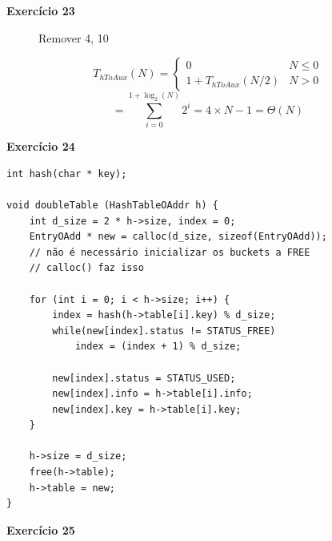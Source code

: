 \documentclass[a4paper,11pt]{article}
\begin{document}
\noindent \textbf{Exercício 23}

\begin{figure}[H]
	\centering
	\caption{Remover 4, 10}
\end{figure}

\[
	T_{hToAux}(N) =
	\begin{cases}
		0 & N \leq 0 \\
		1 + T_{hToAux}(N/2) & N > 0
	\end{cases}
\]
\[
	= \sum_{i=0}^{1+\log_2(N)} 2^i = 4 \times N - 1 = \Theta(N)
\]

\noindent \textbf{Exercício 24}

\begin{verbatim}
int hash(char * key);

void doubleTable (HashTableOAddr h) {
	int d_size = 2 * h->size, index = 0;
	EntryOAdd * new = calloc(d_size, sizeof(EntryOAdd));
	// não é necessário inicializar os buckets a FREE
	// calloc() faz isso
	
	for (int i = 0; i < h->size; i++) {
		index = hash(h->table[i].key) % d_size;
		while(new[index].status != STATUS_FREE)
			index = (index + 1) % d_size;
		
		new[index].status = STATUS_USED;
		new[index].info = h->table[i].info;
		new[index].key = h->table[i].key;
	}
	
	h->size = d_size;
	free(h->table);
	h->table = new;
}
\end{verbatim}

\noindent \textbf{Exercício 25}
\end{document}
